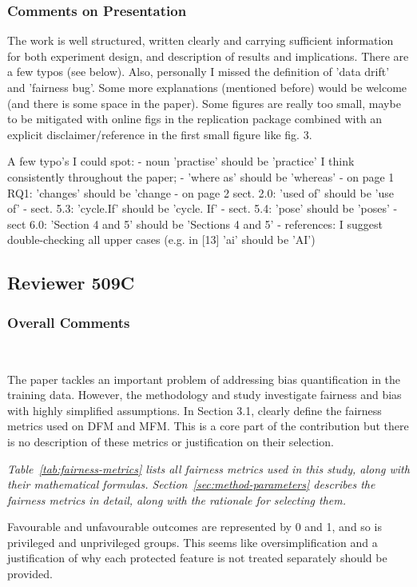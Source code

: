 \documentclass[conference,review,anonymous]{IEEEtran}
\newcommand{\highlight}[1]{\begin{framed}%
  \noindent\emph{#1}
\end{framed}}
\begin{document}
\subsubsection{Comments on Presentation}

The work is well structured, written clearly and carrying sufficient
information for both experiment design, and description of results and
implications. There are a few typos (see below). Also, personally
I missed the definition of 'data drift' and 'fairness bug'. Some more
explanations (mentioned before) would be welcome (and there is some
space in the paper). Some figures are really too small, maybe to be
mitigated with online figs in the replication package combined with an
explicit disclaimer/reference in the first small figure like fig. 3.

A few typo's I could spot:
- noun 'practise' should be 'practice' I think consistently throughout
the paper; - 'where as' should be 'whereas'
- on page 1 RQ1: 'changes' should be 'change
- on page 2 sect. 2.0: 'used of' should be 'use of'
- sect. 5.3: 'cycle.If' should be 'cycle. If'
- sect. 5.4: 'pose' should be 'poses'
- sect 6.0: 'Section 4 and 5' should be 'Sections 4 and 5'
- references: I suggest double-checking all upper cases (e.g. in [13]
'ai' should be 'AI')

\subsection{Reviewer 509C}

\subsubsection{Overall Comments}~\label{sec:509c-overall}

The paper tackles an important problem of addressing bias
quantification in the training data. However, the methodology and
study investigate fairness and bias with highly simplified
assumptions. In Section 3.1, clearly define the fairness metrics used
on DFM and MFM. This is a core part of the contribution but there is
no description of these metrics or justification on their
selection.

\highlight{Table~\ref{tab:fairness-metrics} lists all fairness metrics
used in this study, along with their mathematical
formulas. Section~\ref{sec:method-parameters} describes the fairness
metrics in detail, along with the rationale for selecting them.}

Favourable and unfavourable outcomes are represented by
0 and 1, and so is privileged and unprivileged groups. This seems like
oversimplification and a justification of why each protected feature
is not treated separately should be provided.
\end{document}
